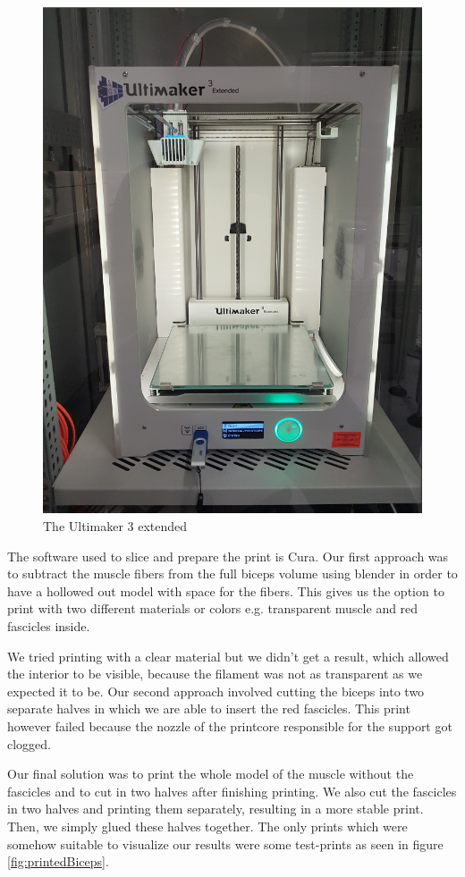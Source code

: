 \documentclass[preprint,journal]{vgtc}       %
\begin{document}
\begin{figure}
	\centering
	\includegraphics[width=.75\linewidth]{ultimaker-pinter2.png}
	\caption{The Ultimaker 3 extended}
	\label{fig:3dPrinter}
\end{figure}

The software used to slice and prepare the print is Cura. 
Our first approach was to subtract the muscle fibers from the full biceps volume using blender in order to have a hollowed out model with space for the fibers. 
This gives us the option to print with two different materials or colors e.g. transparent muscle and red fascicles inside. 

We tried printing with a clear material but we didn't get a result, which allowed the interior to be visible, because the filament was not as transparent as we expected it to be.
Our second approach involved cutting the biceps into two separate halves in which we are able to insert the red fascicles. 
This print however failed because the nozzle of the printcore responsible for the support got clogged. 

Our final solution was to print the whole model of the muscle without the fascicles and to cut in two halves after finishing printing.  
We also cut the fascicles in two halves and printing them separately, resulting in a more stable print. 
Then, we simply glued these halves together.
The only prints which were somehow suitable to visualize our results were some test-prints as seen in figure \ref{fig:printedBiceps}.
\end{document}
